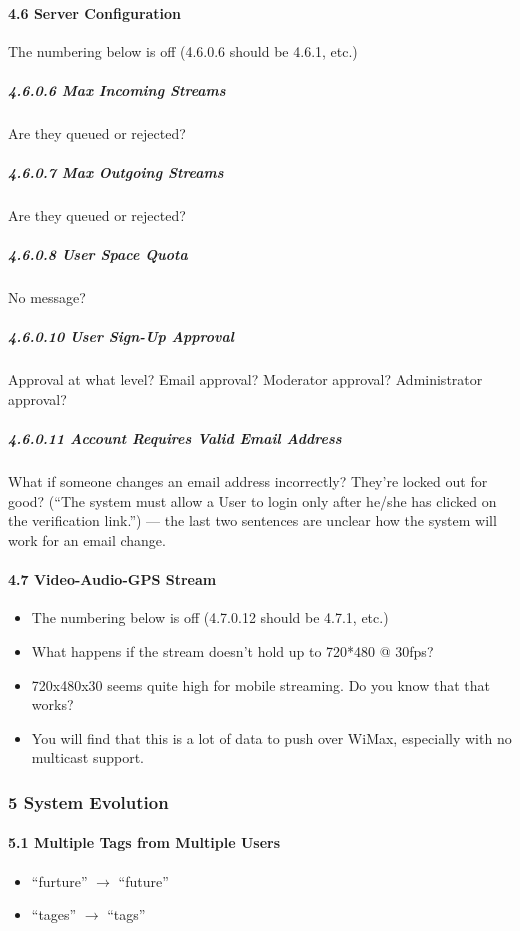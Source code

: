 \documentclass{article}
\begin{document}
\paragraph{4.6  Server Configuration}
    The numbering below is off (4.6.0.6 should be 4.6.1, etc.)
\subparagraph{4.6.0.6  Max Incoming Streams}
    Are they queued or rejected?
\subparagraph{4.6.0.7  Max Outgoing Streams}
    Are they queued or rejected?
\subparagraph{4.6.0.8  User Space Quota}
    No message?
\subparagraph{4.6.0.10  User Sign-Up Approval}
    Approval at what level?  Email approval?  Moderator approval?
    Administrator approval?
\subparagraph{4.6.0.11  Account Requires Valid Email Address}
    What if someone changes an email address incorrectly?  They're locked out
    for good? (``The system must allow a User to login only after he/she has
    clicked on the verification link.'') --- the last two sentences are unclear
    how the system will work for an email change.


\paragraph{4.7  Video-Audio-GPS Stream}
\begin{itemize}
    \item The numbering below is off (4.7.0.12 should be 4.7.1, etc.)
    \item What happens if the stream doesn't hold up to 720*480 @ 30fps?
    \item 720x480x30 seems quite high for mobile streaming. Do you know that that
works?
    \item You will find that this is a lot of data to push over WiMax,
    especially with no multicast support.
\end{itemize}


\subsubsection{5  System Evolution}
\paragraph{5.1  Multiple Tags from Multiple Users}
\begin{itemize}
    \item ``furture'' $\rightarrow$ ``future''
    \item ``tages'' $\rightarrow$ ``tags''
\end{itemize}
\end{document}
